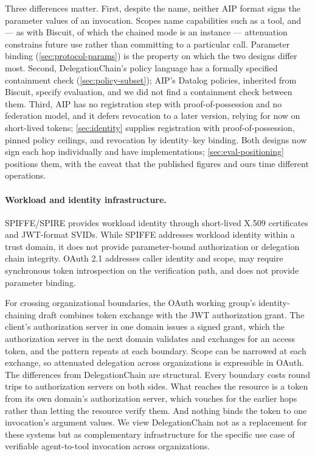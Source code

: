 \documentclass[11pt,a4paper]{article}
\begin{document}
Three differences matter. First, despite the name, neither AIP format
signs the parameter values of an invocation. Scopes name capabilities
such as a tool, and --- as with Biscuit, of which the chained mode is an
instance --- attenuation constrains future use rather than committing to
a particular call. Parameter binding (\cref{sec:protocol-params}) is the
property on which the two designs differ most. Second, DelegationChain's
policy language has a formally specified containment check
(\cref{sec:policy-subset}); AIP's Datalog policies, inherited from
Biscuit, specify evaluation, and we did not find a containment check
between them. Third, AIP has no registration step with
proof-of-possession and no federation model, and it defers revocation
to a later version, relying for now on short-lived tokens;
\cref{sec:identity} supplies registration with proof-of-possession,
pinned policy ceilings, and revocation by identity--key binding. Both
designs now sign each hop individually and have implementations;
\cref{sec:eval-positioning} positions them, with the caveat that the
published figures and ours time different operations.

\paragraph{Workload and identity infrastructure.}
SPIFFE/SPIRE \citep{spiffe} provides workload identity through
short-lived X.509 certificates and JWT-format SVIDs. While SPIFFE
addresses workload identity within a trust domain, it does not
provide parameter-bound authorization or delegation chain integrity.
OAuth 2.1 \citep{oauth21} addresses caller
identity and scope, may require synchronous token introspection on the
verification path, and does not provide parameter binding.

For crossing organizational boundaries, the OAuth working group's
identity-chaining draft \citep{oauth-identity-chaining} combines token
exchange with the JWT authorization grant. The client's authorization
server in one domain issues a signed grant, which the authorization
server in the next domain validates and exchanges for an access token,
and the pattern repeats at each boundary. Scope can be narrowed at each
exchange, so attenuated delegation across organizations is expressible
in OAuth. The differences from DelegationChain are structural. Every
boundary costs round trips to authorization servers on both sides. What
reaches the resource is a token from its own domain's authorization
server, which vouches for the earlier hops rather than letting the
resource verify them. And nothing binds the token to one invocation's
argument values. We view
DelegationChain not as a replacement for these systems but as
complementary infrastructure for the specific use case of verifiable
agent-to-tool invocation across organizations.
\end{document}
